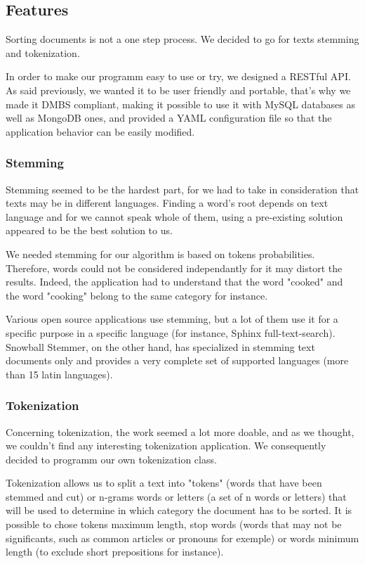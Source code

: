 \documentclass[a4paper,11pt]{article}
\begin{document}
\subsection{Features}

Sorting documents is not a one step process. We decided to go for texts
stemming and tokenization.

In order to make our programm easy to use or try, we designed a RESTful API.
As said previously, we wanted it to be user friendly and portable, that's why
we made it DMBS compliant, making it possible to use it with MySQL databases
as well as MongoDB ones, and provided a YAML configuration file so that the
application behavior can be easily modified.

\subsubsection{Stemming}

Stemming seemed to be the hardest part, for we had to take in consideration
that texts may be in different languages. Finding a word's root depends on
text language and for we cannot speak whole of them, using a pre-existing
solution appeared to be the best solution to us.

We needed stemming for our algorithm is based on tokens probabilities.
Therefore, words could not be considered independantly for it may distort
the results. Indeed, the application had to understand that the word "cooked"
and the word "cooking" belong to the same category for instance.

Various open source applications use stemming, but a lot of them use it for
a specific purpose in a specific language (for instance, Sphinx
full-text-search). Snowball Stemmer, on the other hand, has specialized in
stemming text documents only and provides a very complete set of supported
languages (more than 15 latin languages).

\subsubsection{Tokenization}

Concerning tokenization, the work seemed a lot more doable, and as we
thought, we couldn't find any interesting tokenization application. We
consequently decided to programm our own tokenization class.

Tokenization allows us to split a text into "tokens" (words that have
been stemmed and cut) or n-grams words or letters (a set of n words or
letters) that will be used to determine in which category the document has to
 be sorted. It is possible to chose tokens maximum length, stop words (words
that may not be significants, such as common articles or pronouns for
exemple) or words minimum length (to exclude short prepositions for
instance).
\end{document}
